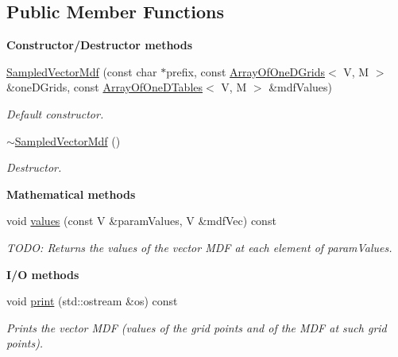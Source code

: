 \subsection*{Public Member Functions}
\begin{Indent}{\bf Constructor/\-Destructor methods}\par
\begin{DoxyCompactItemize}
\item 
\hyperlink{class_q_u_e_s_o_1_1_sampled_vector_mdf_ad66c0648ca45526f0912634b2042cba9}{Sampled\-Vector\-Mdf} (const char $\ast$prefix, const \hyperlink{class_q_u_e_s_o_1_1_array_of_one_d_grids}{Array\-Of\-One\-D\-Grids}$<$ V, M $>$ \&one\-D\-Grids, const \hyperlink{class_q_u_e_s_o_1_1_array_of_one_d_tables}{Array\-Of\-One\-D\-Tables}$<$ V, M $>$ \&mdf\-Values)
\begin{DoxyCompactList}\small\item\em Default constructor. \end{DoxyCompactList}\item 
\hyperlink{class_q_u_e_s_o_1_1_sampled_vector_mdf_ab1d081a98ca1285a6fc3d29029c3632c}{$\sim$\-Sampled\-Vector\-Mdf} ()
\begin{DoxyCompactList}\small\item\em Destructor. \end{DoxyCompactList}\end{DoxyCompactItemize}
\end{Indent}
\begin{Indent}{\bf Mathematical methods}\par
\begin{DoxyCompactItemize}
\item 
void \hyperlink{class_q_u_e_s_o_1_1_sampled_vector_mdf_af4b8d3c492d7cfb94ac82da8df8779e9}{values} (const V \&param\-Values, V \&mdf\-Vec) const 
\begin{DoxyCompactList}\small\item\em T\-O\-D\-O\-: Returns the values of the vector M\-D\-F at each element of {\ttfamily param\-Values}. \end{DoxyCompactList}\end{DoxyCompactItemize}
\end{Indent}
\begin{Indent}{\bf I/\-O methods}\par
\begin{DoxyCompactItemize}
\item 
void \hyperlink{class_q_u_e_s_o_1_1_sampled_vector_mdf_af4a617a8e579abb72bf9d91d7ddb17e0}{print} (std\-::ostream \&os) const 
\begin{DoxyCompactList}\small\item\em Prints the vector M\-D\-F (values of the grid points and of the M\-D\-F at such grid points). \end{DoxyCompactList}\end{DoxyCompactItemize}
\end{Indent}
